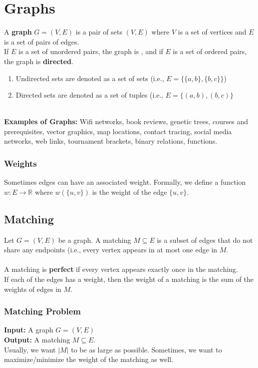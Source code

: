 \documentclass{article}
\begin{document}
\section{Graphs}
A \textbf{graph} $G = (V, E)$ is a pair of sets $(V,E)$ where $V$ is a set of vertices and $E$ is a set of pairs of edges.\\
If $E$ is a set of unordered pairs, the graph is , and if $E$ is a set of ordered pairs, the graph is \textbf{directed}.
\begin{enumerate}
    \item Undirected sets are denoted as a set of sets (i.e., $E = \{ \{a,b\}, \{b, c\} \}$)
    \item Directed sets are denoted as a set of tuples (i.e., $E = \{ (a, b), (b, c) \}$
\end{enumerate}
\\
\textbf{Examples of Graphs: } Wifi networks, book reviews, genetic trees, courses and prerequisites, vector graphics, map locations, contact tracing, social media networks, web links, tournament brackets, binary relations, functions.

\subsubsection{Weights}
Sometimes edges can have an associated weight. Formally, we define a function $w: E \to \mathbb{R}$ where $w ( \{u, v\})$ is the weight of the edge $\{u, v\}$.

\subsection{Matching}
Let $G = (V, E) $ be a graph. A matching $M \subseteq E$ is a subset of edges that do not share any endpoints (i.e., every vertex appears in at most one edge in $M$.\\
\\
A matching is \textbf{perfect} if every vertex appears exactly once in the matching.\\
If each of the edges has a weight, then the weight of a matching is the sum of the weights of edges in $M$.

\subsubsection{Matching Problem}
\textbf{Input: }A graph $G = (V, E)$\\
\textbf{Output: }A matching $M \subseteq E$.\\
Usually, we want $|M|$ to be as large as possible. Sometimes, we want to maximize/minimize the weight of the matching as well.
\end{document}
